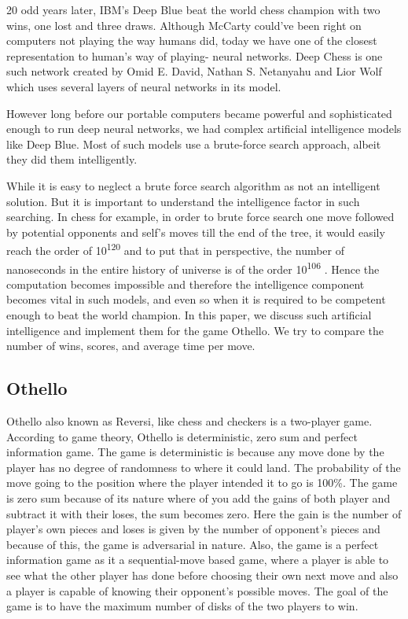 \documentclass{svproc}
\begin{document}
20 odd years later, IBM's Deep Blue beat the world chess champion with two wins, one lost and three draws. Although McCarty could've been right on computers not playing the way humans did, today we have one of the closest representation to human's way of playing- neural networks. Deep Chess is one such network created by Omid E. David, Nathan S. Netanyahu and Lior Wolf \cite{deepchess} which uses several layers of neural networks in its model.

However long before our portable computers became powerful and sophisticated enough to run deep neural networks, we had complex artificial intelligence models like Deep Blue. Most of such models use a brute-force search approach, albeit they did them intelligently.

While it is easy to neglect a brute force search algorithm as not an intelligent solution. But it is important to understand the intelligence factor in such searching. In chess for example, in order to brute force search one move followed by potential opponents and self's moves till the end of the tree, it would easily reach the order of 10\textsuperscript{120} and to put that in perspective, the number of nanoseconds in the entire history of universe is of the order 10\textsuperscript{106} \cite{MIT_lecture}. Hence the computation becomes impossible and therefore the intelligence component becomes vital in such models, and even so when it is required to be competent enough to beat the world champion. In this paper, we discuss such artificial intelligence and implement them for the game Othello. We try to compare the number of wins, scores, and average time per move.

\subsection{Othello}

Othello also known as Reversi, like chess and checkers is a two-player game. According to game theory, Othello is deterministic, zero sum and perfect information game. The game is deterministic is because any move done by the player has no degree of randomness to where it could land. The probability of the move going to the position where the player intended it to go is 100\%. The game is zero sum because of its nature where of you add the gains of both player and subtract it with their loses, the sum becomes zero. Here the gain is the number of player's own pieces and loses is given by the number of opponent's pieces and because of this, the game is adversarial in nature. Also, the game is a perfect information game as it a sequential-move based game, where a player is able to see what the other player has done before choosing their own next move and also a player is capable of knowing their opponent's possible moves. The goal of the game is to have the maximum number of disks of the two players to win.
\end{document}
